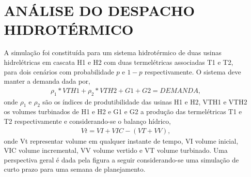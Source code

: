 \documentclass[12pt,fleqn]{article}
\begin{document}
\section{AN\'ALISE DO DESPACHO HIDROT\'ERMICO}
A simula\c c\~ao  foi constitu\'ida para um sistema hidrot\'ermico de duas usinas hidrel\'etricas em cascata
H1 e H2 com duas termel\'etricas associadas T1 e T2, para dois cen\'arios com probabilidade $p$ e $1-p$ respectivamente.
O sistema deve manter a demanda dada por,
\begin{align}
  \displaystyle{\rho}_1*VTH1 + {\rho}_2*VTH2 + G1 + G2 = DEMANDA,
\end{align}
onde $\rho_1$ e $\rho_2$ s\~ao os \'indices de produtibilidade das usinas H1 e H2, VTH1 e VTH2  os volumes turbinados de
H1 e H2 e G1 e G2 a
produ\c c\~ao das termel\'etricas T1 e T2 respectivamente e considerando-se o balan\c co h\'idrico,
\begin{align}
  \displaystyle Vt = VI + VIC - \left( VT + VV \right), 
\end{align}
onde Vt representar volume em qualquer instante de tempo, VI volume inicial, VIC volume incremental, VV volume vertido e
VT volume turbinado. Uma perspectiva geral \'e dada pela figura a seguir considerando-se uma simula\c c\~ao de curto prazo para uma semana de planejamento.
\end{document}
